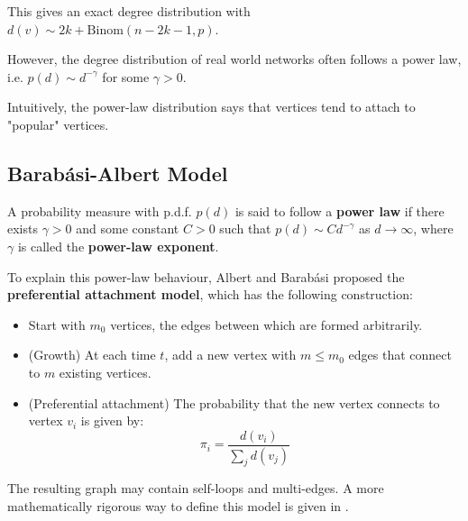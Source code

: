 \documentclass{article}
\begin{document}
This gives an exact degree distribution with $d(v) \sim 2k+\mathrm{Binom}(n-2k-1, p)$.

However, the degree distribution of real world networks often follows a power law, i.e. $p(d)\sim d^{-\gamma}$ for some $\gamma>0$.  

\begin{remark}
    Intuitively, the power-law distribution says that vertices tend to attach to "popular" vertices.
\end{remark}

\subsection{Barab\'{a}si-Albert Model}

\begin{definition}
    A probability measure with p.d.f. $p(d)$ is said to follow a \textbf{power law} if there exists $\gamma>0$ and some constant $C>0$ such that $p(d)\sim C d^{-\gamma}$ as $d\to \infty$, where $\gamma$ is called the \textbf{power-law exponent}.
\end{definition}

To explain this power-law behaviour, Albert and Barab\'{a}si proposed the \textbf{preferential attachment model}, which has the following construction:
\begin{itemize}
    \item Start with $m_0$ vertices, the edges between which are formed arbitrarily.  
    \item (Growth) At each time $t$, add a new vertex with $m\leq m_0$ edges that connect to $m$ existing vertices.
    \item (Preferential attachment) The probability that the new vertex connects to vertex $v_i$ is given by:
    \begin{equation*}
        \pi_i = \frac{d(v_i)}{\sum_j d(v_j)}
    \end{equation*}
\end{itemize}

The resulting graph may contain self-loops and multi-edges. A more mathematically rigorous way to define this model is given in \citep{barabasi2016network}.  
\end{document}
